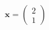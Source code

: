\documentclass[preview]{standalone}
\begin{document}
\begin{align*}
\mathbf{x} = \begin{pmatrix} 2 \\ 1 \end{pmatrix}
\end{align*}
\end{document}
